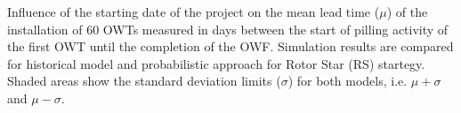 \label{fig:comparison}
Influence of the starting date of the project on the mean lead time ($\mu$) of the installation of 60 OWTs measured in days between the start of pilling activity of the first OWT until the completion of the OWF. Simulation results are compared for historical model and probabilistic approach for Rotor Star (RS) startegy. Shaded areas show the standard deviation limits ($\sigma$) for both models, i.e. $\mu + \sigma$ and $\mu - \sigma$.